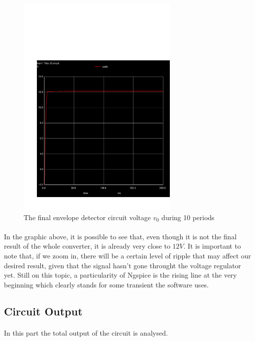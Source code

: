 \begin{figure}[H] \centering
\includegraphics[trim= 0cm 0cm 0cm 10cm, clip, width=0.7\textwidth]{trans1.pdf}
\caption{The final envelope detector circuit voltage $v_0$ during 10 periods}
\label{fig:sim_envelope}
\end{figure}

\paragraph{}
In the graphic above, it is possible to see that, even though it is not the final result of the whole converter, it is already very close to $12V$. It is important to note that, if we zoom in, there will be a certain level of ripple that may affect our desired result, given that the signal hasn't gone throught the voltage regulator yet. Still on this topic, a particularity of Ngspice is the rising line at the very beginning which clearly stands for some transient the software uses.

\subsection{Circuit Output}

\paragraph{}
In this part the total output of the circuit is analysed.

